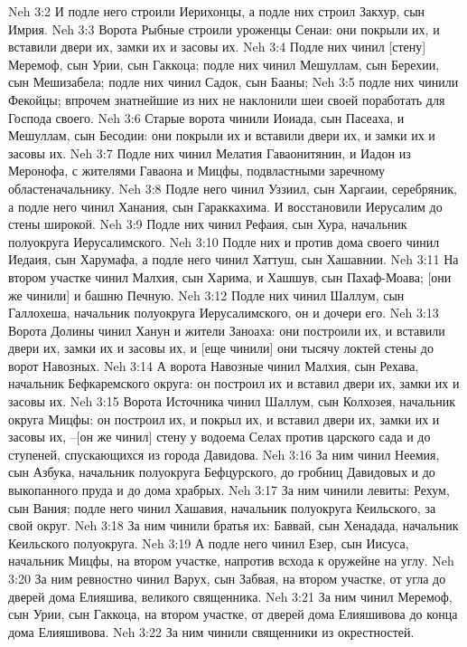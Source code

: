 Neh 3:2  И подле него строили Иерихонцы, а подле них строил Закхур, сын Имрия.
Neh 3:3  Ворота Рыбные строили уроженцы Сенаи: они покрыли их, и вставили двери их, замки их и засовы их.
Neh 3:4  Подле них чинил [стену] Меремоф, сын Урии, сын Гаккоца; подле них чинил Мешуллам, сын Берехии, сын Мешизабела; подле них чинил Садок, сын Бааны;
Neh 3:5  подле них чинили Фекойцы; впрочем знатнейшие из них не наклонили шеи своей поработать для Господа своего.
Neh 3:6  Старые ворота чинили Иоиада, сын Пасеаха, и Мешуллам, сын Бесодии: они покрыли их и вставили двери их, и замки их и засовы их.
Neh 3:7  Подле них чинил Мелатия Гаваонитянин, и Иадон из Меронофа, с жителями Гаваона и Мицфы, подвластными заречному областеначальнику.
Neh 3:8  Подле него чинил Уззиил, сын Харгаии, серебряник, а подле него чинил Ханания, сын Гараккахима. И восстановили Иерусалим до стены широкой.
Neh 3:9  Подле них чинил Рефаия, сын Хура, начальник полуокруга Иерусалимского.
Neh 3:10  Подле них и против дома своего чинил Иедаия, сын Харумафа, а подле него чинил Хаттуш, сын Хашавнии.
Neh 3:11  На втором участке чинил Малхия, сын Харима, и Хашшув, сын Пахаф-Моава; [они же чинили] и башню Печную.
Neh 3:12  Подле них чинил Шаллум, сын Галлохеша, начальник полуокруга Иерусалимского, он и дочери его.
Neh 3:13  Ворота Долины чинил Ханун и жители Заноаха: они построили их, и вставили двери их, замки их и засовы их, и [еще чинили] они тысячу локтей стены до ворот Навозных.
Neh 3:14  А ворота Навозные чинил Малхия, сын Рехава, начальник Бефкаремского округа: он построил их и вставил двери их, замки их и засовы их.
Neh 3:15  Ворота Источника чинил Шаллум, сын Колхозея, начальник округа Мицфы: он построил их, и покрыл их, и вставил двери их, замки их и засовы их, --[он же чинил] стену у водоема Селах против царского сада и до ступеней, спускающихся из города Давидова.
Neh 3:16  За ним чинил Неемия, сын Азбука, начальник полуокруга Бефцурского, до гробниц Давидовых и до выкопанного пруда и до дома храбрых.
Neh 3:17  За ним чинили левиты: Рехум, сын Вания; подле него чинил Хашавия, начальник полуокруга Кеильского, за свой округ.
Neh 3:18  За ним чинили братья их: Баввай, сын Хенадада, начальник Кеильского полуокруга.
Neh 3:19  А подле него чинил Езер, сын Иисуса, начальник Мицфы, на втором участке, напротив всхода к оружейне на углу.
Neh 3:20  За ним ревностно чинил Варух, сын Забвая, на втором участке, от угла до дверей дома Елияшива, великого священника.
Neh 3:21  За ним чинил Меремоф, сын Урии, сын Гаккоца, на втором участке, от дверей дома Елияшивова до конца дома Елияшивова.
Neh 3:22  За ним чинили священники из окрестностей.

